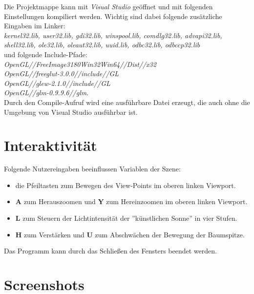 \documentclass{scrartcl}
\begin{document}
Die Projektmappe kann mit \emph{Visual Studio} geöffnet und mit folgenden Einstellungen kompiliert werden.
Wichtig sind dabei folgende zusätzliche Eingaben im Linker: \\
\emph{kernel32.lib, user32.lib, gdi32.lib, winspool.lib, comdlg32.lib, advapi32.lib, shell32.lib, ole32.lib, oleaut32.lib, uuid.lib, odbc32.lib, odbccp32.lib}\\
und folgende Include-Pfade:\\
\emph{
OpenGL//FreeImage3180Win32Win64//Dist//x32\\
OpenGL//freeglut-3.0.0//include//GL\\
OpenGL//glew-2.1.0//include//GL\\
OpenGL//glm-0.9.9.6//glm}.\\
Durch den Compile-Aufruf wird eine ausführbare Datei erzeugt, die auch ohne die Umgebung von Visual Studio ausführbar ist.

\section{Interaktivität}

Folgende Nutzereingaben beeinflussen Variablen der Szene:

\begin{itemize}
	\item die Pfeiltasten zum Bewegen des View-Points im oberen linken Viewport.
	\item \textbf{A} zum Herauszoomen und \textbf{Y} zum Hereinzoomen im oberen linken Viewport.
	\item \textbf{L} zum Steuern der Lichtintensität der ''künstlichen Sonne'' in vier Stufen.
	\item \textbf{H} zum Verstärken und \textbf{U} zum Abschwächen der Bewegung der Baumspitze.
\end{itemize}

Das Programm kann durch das Schließen des Fensters beendet werden.

\section{Screenshots}
\end{document}
